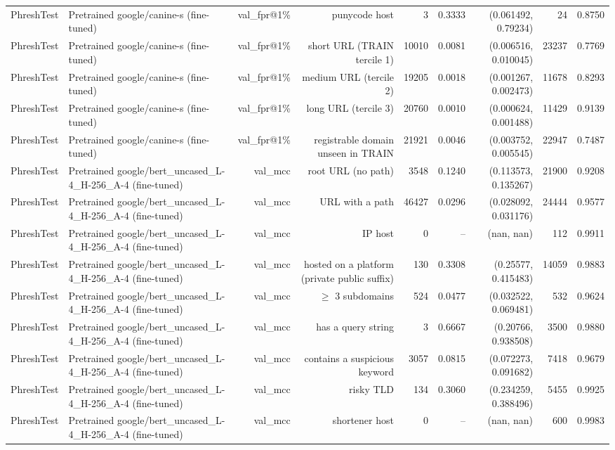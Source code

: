 \begin{table}[t]
\begin{tabular}{llrrrrrrr}
PhreshTest & Pretrained google/canine-s (fine-tuned) & val\_fpr@1\% & punycode host & 3 & 0.3333 & (0.061492, 0.79234) & 24 & 0.8750 \\
PhreshTest & Pretrained google/canine-s (fine-tuned) & val\_fpr@1\% & short URL (TRAIN tercile 1) & 10010 & 0.0081 & (0.006516, 0.010045) & 23237 & 0.7769 \\
PhreshTest & Pretrained google/canine-s (fine-tuned) & val\_fpr@1\% & medium URL (tercile 2) & 19205 & 0.0018 & (0.001267, 0.002473) & 11678 & 0.8293 \\
PhreshTest & Pretrained google/canine-s (fine-tuned) & val\_fpr@1\% & long URL (tercile 3) & 20760 & 0.0010 & (0.000624, 0.001488) & 11429 & 0.9139 \\
PhreshTest & Pretrained google/canine-s (fine-tuned) & val\_fpr@1\% & registrable domain unseen in TRAIN & 21921 & 0.0046 & (0.003752, 0.005545) & 22947 & 0.7487 \\
PhreshTest & Pretrained google/bert\_uncased\_L-4\_H-256\_A-4 (fine-tuned) & val\_mcc & root URL (no path) & 3548 & 0.1240 & (0.113573, 0.135267) & 21900 & 0.9208 \\
PhreshTest & Pretrained google/bert\_uncased\_L-4\_H-256\_A-4 (fine-tuned) & val\_mcc & URL with a path & 46427 & 0.0296 & (0.028092, 0.031176) & 24444 & 0.9577 \\
PhreshTest & Pretrained google/bert\_uncased\_L-4\_H-256\_A-4 (fine-tuned) & val\_mcc & IP host & 0 & -- & (nan, nan) & 112 & 0.9911 \\
PhreshTest & Pretrained google/bert\_uncased\_L-4\_H-256\_A-4 (fine-tuned) & val\_mcc & hosted on a platform (private public suffix) & 130 & 0.3308 & (0.25577, 0.415483) & 14059 & 0.9883 \\
PhreshTest & Pretrained google/bert\_uncased\_L-4\_H-256\_A-4 (fine-tuned) & val\_mcc & $\geq$ 3 subdomains & 524 & 0.0477 & (0.032522, 0.069481) & 532 & 0.9624 \\
PhreshTest & Pretrained google/bert\_uncased\_L-4\_H-256\_A-4 (fine-tuned) & val\_mcc & has a query string & 3 & 0.6667 & (0.20766, 0.938508) & 3500 & 0.9880 \\
PhreshTest & Pretrained google/bert\_uncased\_L-4\_H-256\_A-4 (fine-tuned) & val\_mcc & contains a suspicious keyword & 3057 & 0.0815 & (0.072273, 0.091682) & 7418 & 0.9679 \\
PhreshTest & Pretrained google/bert\_uncased\_L-4\_H-256\_A-4 (fine-tuned) & val\_mcc & risky TLD & 134 & 0.3060 & (0.234259, 0.388496) & 5455 & 0.9925 \\
PhreshTest & Pretrained google/bert\_uncased\_L-4\_H-256\_A-4 (fine-tuned) & val\_mcc & shortener host & 0 & -- & (nan, nan) & 600 & 0.9983 \\

\end{tabular}
\end{table}
